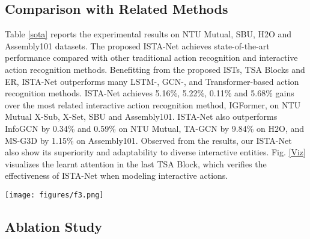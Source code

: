 \documentclass[letterpaper, 10 pt, conference]{ieeeconf}
\begin{document}
\subsection{Comparison with Related Methods}

Table \ref{sota} reports the experimental results on NTU Mutual, SBU, H2O and Assembly101 datasets. The proposed ISTA-Net achieves state-of-the-art performance compared with other traditional action recognition and interactive action recognition methods. Benefitting from the proposed ISTs, TSA Blocks and ER, ISTA-Net outperforms many LSTM-, GCN-, and Transformer-based action recognition methods. ISTA-Net achieves 5.16\%, 5.22\%, 0.11\% and 5.68\% gains over the most related interactive action recognition method, IGFormer\cite{igformer2022}, on NTU Mutual X-Sub, X-Set, SBU and Assembly101. ISTA-Net also outperforms InfoGCN\cite{InfoGCN2022} by 0.34\% and 0.59\% on NTU Mutual, TA-GCN\cite{H2O_TA-GCN2021} by 9.84\% on H2O, and MS-G3D\cite{MS-G3D2020} by 1.15\% on Assembly101. Observed from the results, our ISTA-Net also show its superiority and adaptability to diverse interactive entities. Fig. \ref{Viz} visualizes the learnt attention in the last TSA Block, which verifies the effectiveness of ISTA-Net when modeling interactive actions.


\begin{figure*}[t]
    \begin{center}
    \texttt{[image: figures/f3.png]}
    \end{center}
    \vspace{-1.2em}
    \caption{Visualization of the learnt interactive relations restored from the last TSA Block. The attentive weights are visualized to illustrate the important body parts involved in recognizing different interactive actions. Specifically, ISTA-Net recognizes the \textit{Punch} action through attentions on the attacker's hands and the victim's limbs. The \textit{Hugging} action is recognized through attentions on the approaching and contacting body parts. The \textit{Giving Object} action is recognized through attentions on the hands.}
    \label{Viz}
    \vspace{-0.3em}
\end{figure*}


\subsection{Ablation Study}
\end{document}
